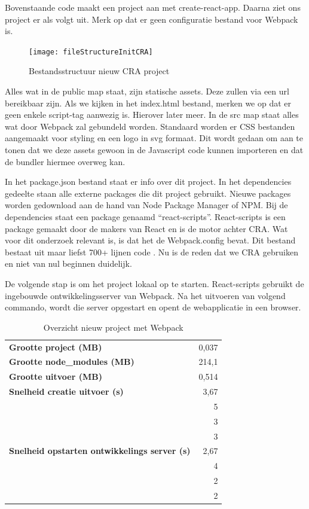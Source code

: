 

Bovenstaande code maakt een project aan met create-react-app. Daarna ziet ons project er als volgt uit. Merk op dat er geen configuratie bestand voor Webpack is.

\begin{figure}[h]
\texttt{[image: fileStructureInitCRA]}
   \centering
   \caption{Bestandsstructuur nieuw CRA project}
\end{figure}

Alles wat in de public map staat, zijn statische assets. Deze zullen via een url bereikbaar zijn. Als we kijken in het index.html bestand, merken we op dat er geen enkele script-tag aanwezig is. Hierover later meer.
In de src map staat alles wat door Webpack zal gebundeld worden. Standaard worden er CSS bestanden aangemaakt voor styling en een logo in svg formaat. Dit wordt gedaan om aan te tonen dat we deze assets gewoon in de Javascript code kunnen importeren en dat de bundler hiermee overweg kan.



In het package.json bestand staat er info over dit project. In het dependencies gedeelte staan alle externe packages die dit project gebruikt. Nieuwe packages worden gedownload aan de hand van Node Package Manager of NPM. Bij de dependencies staat een package genaamd “react-scripts”.
React-scripts \autocite{facebook-2018} is een package gemaakt door de makers van React en is de motor achter CRA.
Wat voor dit onderzoek relevant is, is dat het de Webpack.config bevat. Dit bestand bestaat uit maar liefst 700+ lijnen code \autocite{facebook-2021}. Nu is de reden dat we CRA gebruiken en niet van nul beginnen duidelijk.

De volgende stap is om het project lokaal op te starten. React-scripts gebruikt de ingebouwde ontwikkelingsserver van Webpack. Na het uitvoeren van volgend commando, wordt die server opgestart en opent de webapplicatie in een browser.



\begin{table}[h]
   \centering
   \begin{tabular}{lr}
   \textbf{Grootte project (MB)} & 0,037 \\
   \textbf{Grootte node\_modules (MB)} & 214,1 \\
   \textbf{Grootte uitvoer (MB)} & 0,514 \\
   \textbf{Snelheid creatie uitvoer (s)} & 3,67 \\
   \textbf{} & 5 \\
   \textbf{} & 3 \\
   \textbf{} & 3 \\
   \textbf{Snelheid opstarten ontwikkelings server (s)} & 2,67 \\
   \textbf{} & 4 \\
   \textbf{} & 2 \\
   \textbf{} & 2
   \end{tabular}
   \caption{Overzicht nieuw project met Webpack}
   \end{table}

